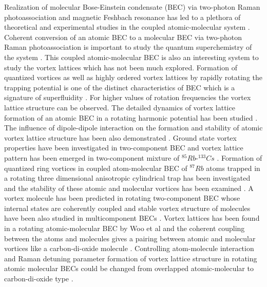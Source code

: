 \documentclass[10pt,a4paper]{article}
\begin{document}
Realization of molecular Bose-Einstein condensate (BEC) via
two-photon Raman photoassociation \cite{Wynar, Winkler, Danzl} and
magnetic Feshbach resonance \cite{Thompson} has led to a plethora
of theoretical and experimental studies in the coupled
atomic-molecular system \cite{Timmermans_1, Timmermans_2, Heinzen,
Olsen, M3, M4}. Coherent conversion of an atomic BEC to a
molecular BEC via two-photon Raman photoassociation is important
to study the quantum superchemistry of the system \cite{Heinzen,
Olsen, Hope}. This coupled atomic-molecular BEC is also an
interesting system to study the vortex lattices which has not been
much explored. Formation of quantized vortices as well as highly
ordered vortex lattices by rapidly rotating the trapping potential
is one of the distinct characteristics of BEC which is a signature
of superfluidity \cite{ Madison, Shaeer}. For higher values of
rotation frequencies the vortex lattice structure can be observed.
The detailed dynamics of vortex lattice formation of an atomic BEC
in a rotating harmonic potential has been studied \cite{Tsubota,
Kasamatsu_1}. The influence of dipole-dipole interaction on the
formation and stability of atomic vortex lattice structure has
been also demonstrated \cite{Kumar_1, Kumar_2}. Ground state
vortex properties have been investigated in two-component BEC
\cite{Wang} and vortex lattice pattern has been emerged in
two-component mixture of $^{85}Rb$-$^{133}Cs$ \cite {Kumar_3}.
Formation of quantized ring vortices in coupled atom-molecular BEC
of $^{87}Rb$ atoms trapped in a rotating three dimensional
anisotropic cylindrical trap has been investigated and the
stability of these atomic and molecular vortices has been examined
\cite{Dutta}. A vortex molecule has been predicted in rotating
two-component BEC whose internal states are coherently coupled
\cite{Kasamatsu_3} and stable vortex structure of molecules have
been also studied in multicomponent BECs \cite{Nitta}. Vortex
lattices has been found in a rotating atomic-molecular BEC by Woo
et al and the coherent coupling between the atoms and molecules
gives a pairing between atomic and molecular vortices like a
carbon-di-oxide molecule \cite{Woo}. Controlling atom-molecule
interaction and Raman detuning parameter formation of vortex
lattice structure in rotating atomic molecular BECs could be
changed from overlapped atomic-molecular to carbon-di-oxide type
\cite{Liu}.
\end{document}
